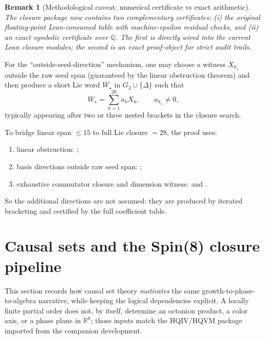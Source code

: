 \documentclass[11pt]{amsart}
\newtheorem{remark}[theorem]{Remark}
\begin{document}
\begin{remark}[Methodological caveat: numerical certificate vs exact arithmetic]
The closure package now contains two complementary certificates: (i) the original floating-point Lean-consumed table with machine-epsilon residual checks, and (ii) an exact symbolic certificate over \(\mathbb Q\). The first is directly wired into the current Lean closure modules; the second is an exact proof-object for strict audit trails.
\end{remark}
For the ``outside-seed-direction'' mechanism, one may choose a witness $X_{k_\star}$ outside the raw seed span (guaranteed by the linear obstruction theorem) and then produce a short Lie word $W_\star$ in $G_2\cup\{\Delta\}$ such that
\[
W_\star=\sum_{k=1}^{28} a_k X_k,\qquad a_{k_\star}\neq 0,
\]
typically appearing after two or three nested brackets in the closure search.

To bridge linear span $\le 15$ to full Lie closure $=28$, the proof uses:
\begin{enumerate}
  \item linear obstruction:
  ;
  \item basis directions outside raw seed span:
  ;
  \item exhaustive commutator closure and dimension witness:
   and .
\end{enumerate}
So the additional directions are not assumed: they are produced by iterated bracketing and certified by the full coefficient table.

\section{Causal sets and the Spin(8) closure pipeline}
\label{sec:cst-forcing}

This section records how causal set theory \emph{motivates} the same growth-to-phase-to-algebra narrative, while keeping the logical dependencies explicit. A locally finite partial order does not, by itself, determine an octonion product, a color axis, or a phase plane in \(\mathbb{R}^8\); those inputs match the HQIV/HQVM package imported from the companion development.
\end{document}

